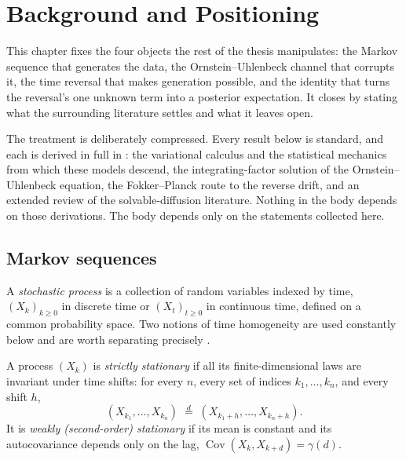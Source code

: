 \chapter{Background and Positioning}
\label{ch:background}

This chapter fixes the four objects the rest of the thesis manipulates: the
Markov sequence that generates the data, the Ornstein--Uhlenbeck channel that
corrupts it, the time reversal that makes generation possible, and the identity
that turns the reversal's one unknown term into a posterior expectation. It
closes by stating what the surrounding literature settles and what it leaves
open.

The treatment is deliberately compressed. Every result below is standard, and
each is derived in full in \compendium{}: the variational calculus and the
statistical mechanics from which these models descend, the integrating-factor
solution of the Ornstein--Uhlenbeck equation, the Fokker--Planck route to the
reverse drift, and an extended review of the solvable-diffusion literature.
Nothing in the body depends on those derivations. The body depends only on the
statements collected here.

\section{Markov sequences}\label{sec:stationarity}\label{sec:markov}

A \emph{stochastic process} is a collection of random variables indexed by
time, $(X_k)_{k \geq 0}$ in discrete time or $(X_t)_{t \geq 0}$ in continuous
time, defined on a common probability space. Two notions of time homogeneity
are used constantly below and are worth separating precisely
\citep{brockwell1991time}.

\begin{definition}\label{def:stationarity}
A process $(X_k)$ is \emph{strictly stationary} if all its finite-dimensional
laws are invariant under time shifts: for every $n$, every set of indices
$k_1, \dots, k_n$, and every shift $h$,
\begin{equation*}
  (X_{k_1}, \dots, X_{k_n})
  \;\stackrel{d}{=}\;
  (X_{k_1 + h}, \dots, X_{k_n + h}) .
\end{equation*}
It is \emph{weakly (second-order) stationary} if its mean is constant and its
autocovariance depends only on the lag,
$\operatorname{Cov}(X_k, X_{k+d}) = \gamma(d)$.
\end{definition}

